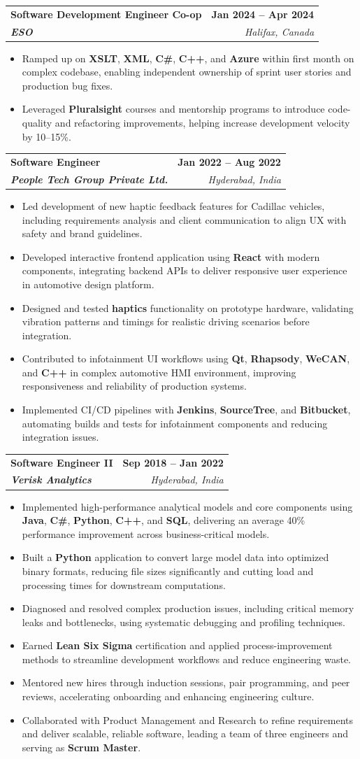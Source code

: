 \documentclass[letterpaper,11pt]{article}
\makeatletter
\newcommand{\resumeItem}[1]{
  \item\small{
    {#1 \vspace{-2pt}}
  }
}
\newcommand{\resumeSubheading}[4]{
  \vspace{-2pt}\item
    \begin{tabular*}{1.0\textwidth}[t]{l@{\extracolsep{\fill}}r}
      \textbf{#1} & \textbf{\small #2} \\
      \textit{\small#3} & \textit{\small #4} \\
    \end{tabular*}\vspace{-7pt}
}
\newcommand{\resumeItemListStart}{\begin{itemize}}
\newcommand{\resumeItemListEnd}{\end{itemize}\vspace{-5pt}}
\makeatother
\begin{document}
    \resumeSubheading
      {\textbf{Software Development Engineer Co-op}}{\textbf{Jan 2024 -- Apr 2024}}
      {\textbf{ESO}}{Halifax, Canada}
      \resumeItemListStart
        \resumeItem{Ramped up on \textbf{XSLT}, \textbf{XML}, \textbf{C\#}, \textbf{C++}, and \textbf{Azure} within first month on complex codebase, enabling independent ownership of sprint user stories and production bug fixes.}
        \resumeItem{Leveraged \textbf{Pluralsight} courses and mentorship programs to introduce code-quality and refactoring improvements, helping increase development velocity by 10--15\%.}
      \resumeItemListEnd

    \resumeSubheading
      {\textbf{Software Engineer}}{\textbf{Jan 2022 -- Aug 2022}}
      {\textbf{People Tech Group Private Ltd.}}{Hyderabad, India}
      \resumeItemListStart
        \resumeItem{Led development of new haptic feedback features for Cadillac vehicles, including requirements analysis and client communication to align UX with safety and brand guidelines.}
        \resumeItem{Developed interactive frontend application using \textbf{React} with modern components, integrating backend APIs to deliver responsive user experience in automotive design platform.}
        \resumeItem{Designed and tested \textbf{haptics} functionality on prototype hardware, validating vibration patterns and timings for realistic driving scenarios before integration.}
        \resumeItem{Contributed to infotainment UI workflows using \textbf{Qt}, \textbf{Rhapsody}, \textbf{WeCAN}, and \textbf{C++} in complex automotive HMI environment, improving responsiveness and reliability of production systems.}
        \resumeItem{Implemented CI/CD pipelines with \textbf{Jenkins}, \textbf{SourceTree}, and \textbf{Bitbucket}, automating builds and tests for infotainment components and reducing integration issues.}
      \resumeItemListEnd

    \resumeSubheading
      {\textbf{Software Engineer II}}{\textbf{Sep 2018 -- Jan 2022}}
      {\textbf{Verisk Analytics}}{Hyderabad, India}
      \resumeItemListStart
        \resumeItem{Implemented high-performance analytical models and core components using \textbf{Java}, \textbf{C\#}, \textbf{Python}, \textbf{C++}, and \textbf{SQL}, delivering an average 40\% performance improvement across business-critical models.}
        \resumeItem{Built a \textbf{Python} application to convert large model data into optimized binary formats, reducing file sizes significantly and cutting load and processing times for downstream computations.}
        \resumeItem{Diagnosed and resolved complex production issues, including critical memory leaks and bottlenecks, using systematic debugging and profiling techniques.}
        \resumeItem{Earned \textbf{Lean Six Sigma} certification and applied process-improvement methods to streamline development workflows and reduce engineering waste.}
        \resumeItem{Mentored new hires through induction sessions, pair programming, and peer reviews, accelerating onboarding and enhancing engineering culture.}
        \resumeItem{Collaborated with Product Management and Research to refine requirements and deliver scalable, reliable software, leading a team of three engineers and serving as \textbf{Scrum Master}.}
      \resumeItemListEnd
\end{document}

